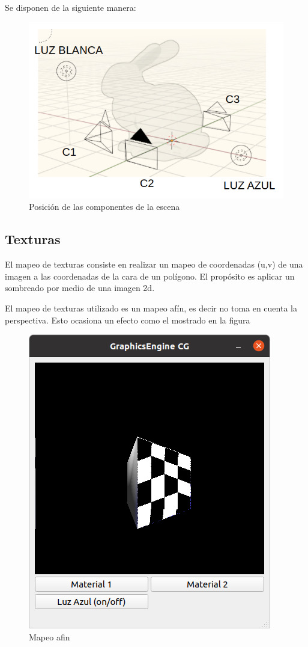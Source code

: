 \documentclass[12pt]{article}
\begin{document}
Se disponen de la siguiente manera: 

\begin{figure}[H]
\centering
\includegraphics[scale=0.6]{images/escena.png}
\caption{Posición de las componentes de la escena}
\end{figure}



\subsection{Texturas}

El mapeo de texturas consiste en realizar un mapeo de coordenadas (u,v) de una imagen a las coordenadas de la cara de un polígono. El propósito es aplicar un sombreado por medio de una imagen 2d.

El mapeo de texturas utilizado es un mapeo afín, es decir no toma en cuenta la perspectiva. Esto ocasiona un efecto como el mostrado en la figura

\begin{figure}[H]
\centering
\includegraphics[scale=0.5]{images/afin.png}
\caption{Mapeo afin}
\end{figure}
\end{document}
